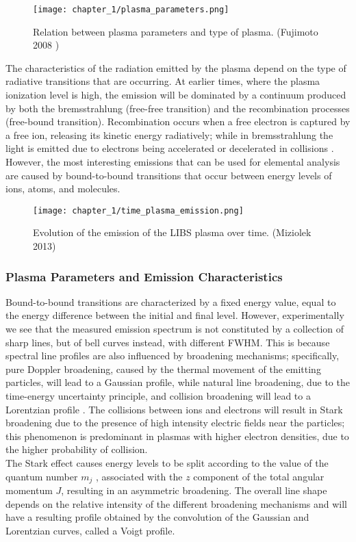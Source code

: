 \begin{figure}[H]
    \centering
    \texttt{[image: chapter\_1/plasma\_parameters.png]}
    \caption{Relation between plasma parameters and type of plasma. (Fujimoto 2008 \cite{fujimotoPlasmaSpectroscopy2008})}
    \label{fig:plasma_parameters}
\end{figure}
The characteristics of the radiation emitted by the plasma depend on the type of radiative transitions that are occurring. At earlier times, where the plasma ionization level is high, the emission will be dominated by a continuum produced by both the bremsstrahlung (free-free transition) and the recombination processes (free-bound transition). Recombination occurs when a free electron is captured by a free ion, releasing its kinetic energy radiatively; while in bremsstrahlung the light is emitted due to electrons being accelerated or decelerated in collisions \cite{anabitarteLaserInducedBreakdownSpectroscopy2012}.
\\
However, the most interesting emissions that can be used for elemental analysis are caused by bound-to-bound transitions that occur between energy levels of ions, atoms, and molecules. 
\begin{figure}[H]
    \centering
    \texttt{[image: chapter\_1/time\_plasma\_emission.png]}
    \caption{Evolution of the emission of the LIBS plasma over time. (Miziolek 2013)}
    \label{fig:time_plasma_emission}
\end{figure}

\subsubsection{Plasma Parameters and Emission Characteristics}
\label{subsubsec:plasma_parameters}
Bound-to-bound transitions are characterized by a fixed energy value, equal to the energy difference between the initial and final level. However, experimentally we see that the measured emission spectrum is not constituted by a collection of sharp lines, but of bell curves instead, with different FWHM. This is because spectral line profiles are also influenced by broadening mechanisms; specifically, pure Doppler broadening, caused by the thermal movement of the emitting particles, will lead to a Gaussian profile, while natural line broadening, due to the time-energy uncertainty principle, and collision broadening will lead to a Lorentzian profile \cite{griemSpectralLineBroadening2012}. The collisions between ions and electrons will result in Stark broadening due to the presence of high intensity electric fields near the particles; this phenomenon is predominant in plasmas with higher electron densities, due to the higher probability of collision. 
\\
The Stark effect causes energy levels to be split according to the value of the quantum number $m_j$ \cite{griffithsIntroductionQuantumMechanics2017}, associated with the $z$ component of the total angular momentum $J$, resulting in an asymmetric broadening.
The overall line shape depends on the relative intensity of the different broadening mechanisms and will have a resulting profile obtained by the convolution of the Gaussian and Lorentzian curves, called a Voigt profile.

